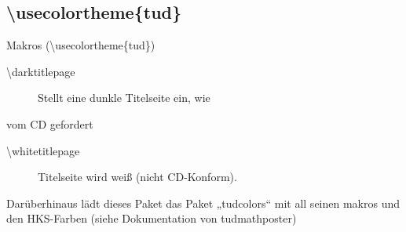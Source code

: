 \documentclass[presentation,t]{beamer}
\begin{document}
\subsection{\textbackslash usecolortheme\{tud\}}
\label{sec:org3a3a7eb}

\begin{frame}[label={sec:org1cc7017}]{Makros (\textbackslash usecolortheme\{tud\})}
\begin{description}
\item[{\textbackslash darktitlepage}] Stellt eine dunkle Titelseite ein, wie
\end{description}
vom CD gefordert
\begin{description}
\item[{\textbackslash whitetitlepage}] Titelseite wird weiß (nicht CD-Konform).
\end{description}

Darüberhinaus lädt dieses Paket das Paket „tudcolors“ mit all seinen
makros und den HKS-Farben (siehe Dokumentation von tudmathposter)
\end{frame}
\end{document}

